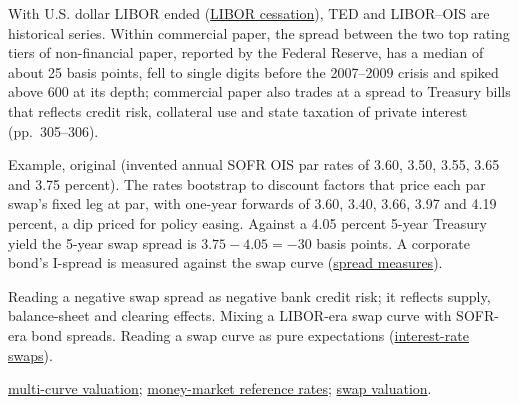 \begin{qfdefinition}
 With U.S. dollar LIBOR ended (\hyperref[meth:policy-path-ois-futures]{LIBOR cessation}), TED and LIBOR--OIS are historical series. Within commercial paper, the spread between the two top rating tiers of non-financial paper, reported by the Federal Reserve, has a median of about 25 basis points, fell to single digits before the 2007--2009 crisis and spiked above 600 at its depth; commercial paper also trades at a spread to Treasury bills that reflects credit risk, collateral use and state taxation of private interest (pp.~305--306).

 Example, original (invented annual SOFR OIS par rates of 3.60, 3.50, 3.55, 3.65 and 3.75 percent). The rates bootstrap to discount factors that price each par swap's fixed leg at par, with one-year forwards of 3.60, 3.40, 3.66, 3.97 and 4.19 percent, a dip priced for policy easing. Against a 4.05 percent 5-year Treasury yield the 5-year swap spread is $3.75-4.05=-30$ basis points. A corporate bond's I-spread is measured against the swap curve (\hyperref[def:bond-yield-spread-measures]{spread measures}).

 Reading a negative swap spread as negative bank credit risk; it reflects supply, balance-sheet and clearing effects. Mixing a LIBOR-era swap curve with SOFR-era bond spreads. Reading a swap curve as pure expectations (\hyperref[def:interest-rate-swaps]{interest-rate swaps}).

 \hyperref[mod:multi-curve-fra-swap-valuation]{multi-curve valuation}; \hyperref[def:money-market-reference-rates]{money-market reference rates}; \hyperref[meth:swap-valuation-replication]{swap valuation}.

\end{qfdefinition}


